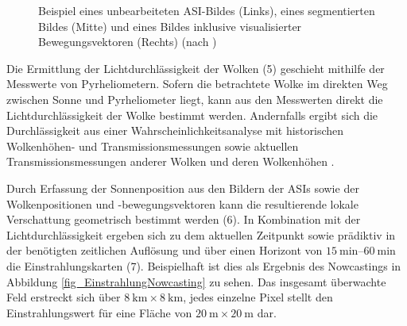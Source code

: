 \begin{figure}[h!]
\centering
\setlength{\fboxsep}{1pt}
\setlength{\fboxrule}{1pt}
\caption[Beispiel eines unbearbeiteten ASI-Bildes, eines segmentierten Bildes und eines Bildes inklusive visualisierter Bewegungsvektoren]{Beispiel eines unbearbeiteten ASI-Bildes (Links), eines segmentierten Bildes (Mitte) und eines Bildes inklusive visualisierter Bewegungsvektoren (Rechts) (nach \cite[S.8]{Sayeef})}
\label{fig_Nowcasting}
\end{figure} \pagebreak

Die Ermittlung der Lichtdurchlässigkeit der Wolken (5) geschieht mithilfe der Messwerte von Pyrheliometern.
Sofern die betrachtete Wolke im direkten Weg zwischen Sonne und Pyrheliometer liegt, kann aus den Messwerten direkt die Lichtdurchlässigkeit der Wolke bestimmt werden.
Andernfalls ergibt sich die Durchlässigkeit aus einer Wahrscheinlichkeitsanalyse mit historischen Wolkenhöhen- und Transmissionsmessungen sowie aktuellen Transmissionsmessungen anderer Wolken und deren Wolkenhöhen \cite{BijanNowcasting}.

Durch Erfassung der Sonnenposition aus den Bildern der ASIs sowie der Wolkenpositionen und -bewegungsvektoren kann die resultierende lokale Verschattung geometrisch bestimmt werden (6).
In Kombination mit der Lichtdurchlässigkeit ergeben sich zu dem aktuellen Zeitpunkt sowie prädiktiv in der benötigten zeitlichen Auflösung und über einen Horizont von $\SIrange{15}{60}{\minute}$ die Einstrahlungskarten (7).
Beispielhaft ist dies als Ergebnis des Nowcastings in Abbildung \ref{fig_EinstrahlungNowcasting} zu sehen.
Das insgesamt überwachte Feld erstreckt sich über $\SI{8}{\kilo\metre} \times \SI{8}{\kilo\metre}$, jedes einzelne Pixel stellt den Einstrahlungswert für eine Fläche von $\SI{20}{\metre} \times \SI{20}{\metre}$ dar. \cite[S.14]{Samu}

